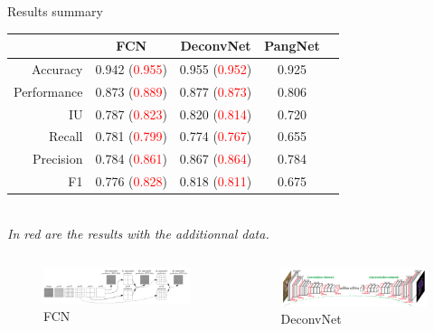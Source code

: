 \documentclass{beamer}
\begin{document}
\begin{frame}{Results summary}

\begin{tabular}{r|c|c|c|c|}
     &        FCN &     DeconvNet  & PangNet \\
\hline
Accuracy           &        0.942 (\textcolor{red}{0.955}) &     0.955 (\textcolor{red}{0.952}) &       0.925 \\
Performance      &        0.873 (\textcolor{red}{0.889}) &     0.877 (\textcolor{red}{0.873}) &       0.806 \\
IU                      &        0.787 (\textcolor{red}{0.823}) &     0.820 (\textcolor{red}{0.814}) &       0.720 \\
Recall                &        0.781 (\textcolor{red}{0.799})  &     0.774 (\textcolor{red}{0.767}) &        0.655 \\
Precision            &        0.784 (\textcolor{red}{0.861}) &     0.867 (\textcolor{red}{0.864}) &        0.784 \\
F1                     &        0.776 (\textcolor{red}{0.828}) &     0.818 (\textcolor{red}{0.811}) &       0.675 \\
\end{tabular} 
\\
\textit{In red are the results with the additionnal data.}

\begin{columns}

\begin{column}{0.4\textwidth}
\begin{figure}
\includegraphics[width = 1.12\linewidth, left]{FCN.png}
\caption{FCN}
\end{figure}
\end{column}

\begin{column}{0.3\textwidth}
\begin{figure}
\includegraphics[width = 1.1\linewidth]{DeconvNet.png}
\caption{DeconvNet}
\end{figure}
\end{column}


\end{columns}
\end{frame}
\end{document}
